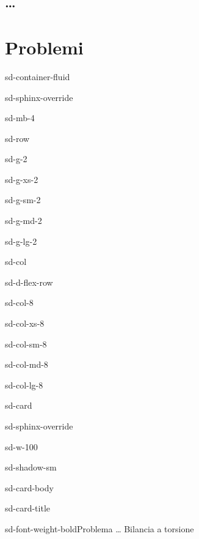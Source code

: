 \documentclass[letterpaper,10pt,italian]{jupyterBook}
\begin{document}
\subsection{…}
\label{\detokenize{ch/electromagnetism/intro-experiments:id1}}
\sphinxstepscope


\section{Problemi}
\label{\detokenize{ch/electromagnetism/intro-problems:problemi}}\label{\detokenize{ch/electromagnetism/intro-problems:physics-hs-electromagnetism-intro-problems}}\label{\detokenize{ch/electromagnetism/intro-problems::doc}}


\begin{sphinxuseclass}{sd-container-fluid}
\begin{sphinxuseclass}{sd-sphinx-override}
\begin{sphinxuseclass}{sd-mb-4}
\begin{sphinxuseclass}{sd-row}
\begin{sphinxuseclass}{sd-g-2}
\begin{sphinxuseclass}{sd-g-xs-2}
\begin{sphinxuseclass}{sd-g-sm-2}
\begin{sphinxuseclass}{sd-g-md-2}
\begin{sphinxuseclass}{sd-g-lg-2}
\begin{sphinxuseclass}{sd-col}
\begin{sphinxuseclass}{sd-d-flex-row}
\begin{sphinxuseclass}{sd-col-8}
\begin{sphinxuseclass}{sd-col-xs-8}
\begin{sphinxuseclass}{sd-col-sm-8}
\begin{sphinxuseclass}{sd-col-md-8}
\begin{sphinxuseclass}{sd-col-lg-8}
\begin{sphinxuseclass}{sd-card}
\begin{sphinxuseclass}{sd-sphinx-override}
\begin{sphinxuseclass}{sd-w-100}
\begin{sphinxuseclass}{sd-shadow-sm}
\begin{sphinxuseclass}{sd-card-body}
\begin{sphinxuseclass}{sd-card-title}
\begin{sphinxuseclass}{sd-font-weight-bold}Problema … Bilancia a torsione
\end{sphinxuseclass}
\end{sphinxuseclass}

\end{sphinxuseclass}
\end{sphinxuseclass}
\end{sphinxuseclass}
\end{sphinxuseclass}
\end{sphinxuseclass}
\end{sphinxuseclass}
\end{sphinxuseclass}
\end{sphinxuseclass}
\end{sphinxuseclass}
\end{sphinxuseclass}
\end{sphinxuseclass}
\end{sphinxuseclass}
\end{sphinxuseclass}
\end{sphinxuseclass}
\end{sphinxuseclass}
\end{sphinxuseclass}
\end{sphinxuseclass}
\end{sphinxuseclass}
\end{sphinxuseclass}
\end{sphinxuseclass}
\end{sphinxuseclass}
\end{document}
